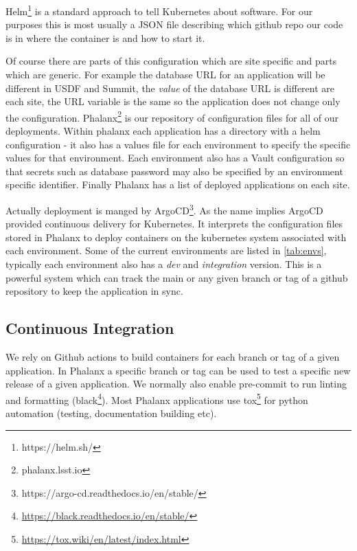 Helm\footnote{https://helm.sh/} is a standard approach to tell Kubernetes about software.
For our purposes this is most usually a JSON file describing which github repo our code is in where the container is and how to start it.

Of course there are parts of this configuration which are site specific and parts which are generic.
For example the database URL for an application will be different in USDF and Summit, the \emph{value} of the database URL is different are each site, the URL variable is the same so the application does not change only the configuration.
Phalanx\footnote{phalanx.lsst.io} is our repository of configuration files for all of our deployments.
Within phalanx each application has a directory with a helm configuration - it also has a values file for each environment to specify the specific values for that environment.
Each environment also has a Vault configuration so that secrets such as database password may also be specified by an environment specific identifier.
Finally Phalanx has a list of deployed applications on each site.

Actually deployment is manged by ArgoCD\footnote{https://argo-cd.readthedocs.io/en/stable/}.
As the name implies ArgoCD provided continuous delivery for Kubernetes.
It interprets the configuration files stored in Phalanx to deploy containers on the kubernetes system associated with each environment.
Some of the current environments are listed in \autoref{tab:envs}, typically each environment also has a \emph{dev} and \emph{integration} version.
This is a powerful system which can track the main or any given branch or tag of a github repository to keep the application in sync.


\subsection{Continuous Integration}
We rely on Github actions to build containers for each branch or tag of a given application.
In Phalanx a specific branch or tag can be used to test a specific new release of a given application.
We normally also enable pre-commit to run linting and formatting (black\footnote{\url{https://black.readthedocs.io/en/stable/}}).
Most Phalanx applications use tox\footnote{\url{https://tox.wiki/en/latest/index.html}} for python automation (testing, documentation building etc).

